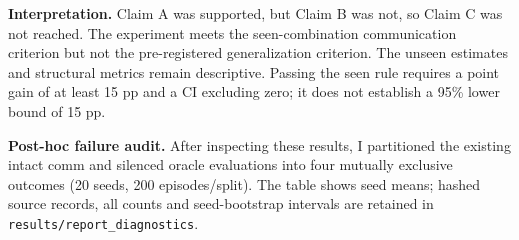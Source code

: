 \textbf{Interpretation.} Claim A was supported, but Claim B was not, so
Claim C was not reached. The experiment meets the seen-combination
communication criterion but not the pre-registered generalization
criterion. The unseen estimates and structural metrics remain
descriptive. Passing the seen rule requires a point gain of at least 15
pp and a CI excluding zero; it does not establish a 95\% lower bound of
15 pp.

\textbf{Post-hoc failure audit.} After inspecting these results, I
partitioned the existing intact comm and silenced oracle evaluations
into four mutually exclusive outcomes (20 seeds, 200 episodes/split).
The table shows seed means; hashed source records, all counts and
seed-bootstrap intervals are retained in
\texttt{results/report\_diagnostics}.

\begin{center}
\small
{}
\end{center}

